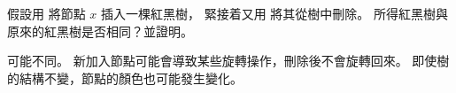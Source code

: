 \startEXERCISE
假設用  將節點 $x$ 插入一棵紅黑樹，
緊接着又用  將其從樹中刪除。
所得紅黑樹與原來的紅黑樹是否相同？並證明。
\stopEXERCISE

\startANSWER
可能不同。
新加入節點可能會導致某些旋轉操作，刪除後不會旋轉回來。
即使樹的結構不變，節點的顏色也可能發生變化。

\externalfigure[e13_4_8-1]

\externalfigure[e13_4_8-2]
\stopANSWER

